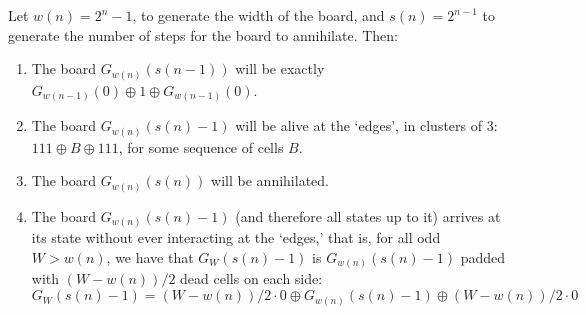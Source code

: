 \documentclass[12pt,letterpaper]{article}
\begin{document}
\begin{prop}\label{Power2} %
  Let $w(n)=2^n-1$, to generate the width of the board, and $s(n)=2^{n-1}$ to generate the number of steps for the board to annihilate. Then:\\
  \vspace*{-1.3em}
  \begin{enumerate}[label=(\alph*)]
    \item\label{a} The board $G_{w(n)}(s(n-1))$ will be exactly $G_{w(n-1)}(0)\oplus 1\oplus G_{w(n-1)}(0)$.
    \item\label{b} The board $G_{w(n)}(s(n)-1)$ will be alive at the `edges', in clusters of 3: $111\oplus B\oplus 111$, for some sequence of cells $B$. 
    \item\label{c} The board $G_{w(n)}(s(n))$ will be annihilated.
    \item\label{d} The board $G_{w(n)}(s(n)-1)$ (and therefore all states up to it) arrives at its state without ever interacting at the `edges,' that is, for all odd $W>w(n)$, we have that $G_{W}(s(n)-1)$ is $G_{w(n)}(s(n)-1)$ padded with $(W-w(n))/2$ dead cells on each side: $$G_{W}(s(n)-1) = (W-w(n))/2\cdot 0 \oplus G_{w(n)}(s(n)-1) \oplus (W-w(n))/2\cdot 0$$
  \end{enumerate}
\end{prop}
\end{document}
